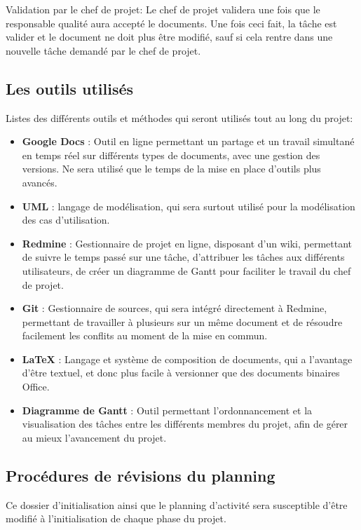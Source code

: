 Validation par le chef de projet:
Le chef de projet validera une fois que le responsable qualité aura accepté le documents. Une fois ceci fait, la tâche est valider et le document ne doit plus être modifié, sauf si cela rentre dans une nouvelle tâche demandé par le chef de projet.

    \subsection{Les outils utilisés}
Listes des différents outils et méthodes qui seront utilisés tout au long du projet:
\begin{itemize}
\item \textbf{Google Docs} : Outil en ligne permettant un partage et un travail simultané en temps réel sur différents types de documents, avec une gestion des versions. Ne sera utilisé que le temps de la mise en place d’outils plus avancés.
\item \textbf{UML} : langage de modélisation, qui sera surtout utilisé pour la modélisation des cas d’utilisation.
\item \textbf{Redmine} : Gestionnaire de projet en ligne, disposant d’un wiki, permettant de suivre le temps passé sur une tâche, d’attribuer les tâches aux différents utilisateurs, de créer un  diagramme de Gantt pour faciliter le travail du chef de projet.
\item \textbf{Git} : Gestionnaire de sources, qui sera intégré directement à Redmine, permettant de travailler à plusieurs sur un même document et de résoudre facilement les conflits au moment de la mise en commun.
\item \textbf{LaTeX} : Langage et système de composition de documents, qui a l’avantage d’être textuel, et donc plus facile à versionner que des documents binaires Office.
\item \textbf{Diagramme de Gantt } : Outil permettant l’ordonnancement et la visualisation des tâches entre les différents membres du projet, afin de gérer au mieux l’avancement du projet.
\end{itemize}

    \subsection{Procédures de révisions du planning}
Ce dossier d'initialisation ainsi que le planning d'activité sera susceptible d'être modifié à l'initialisation de chaque phase du projet.    
